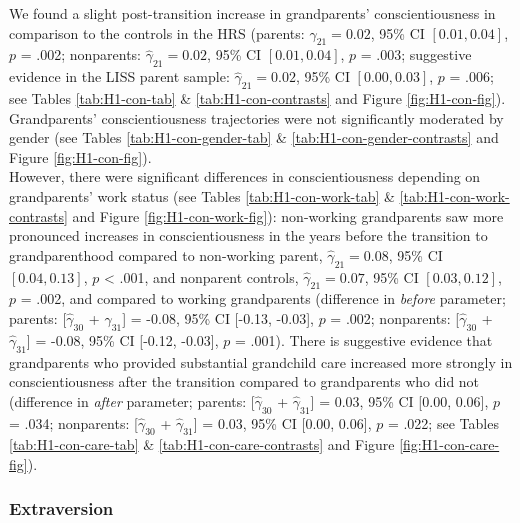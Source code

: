 \documentclass[
  english,
  man, noextraspace]{apa7}
\begin{document}
We found a slight post-transition increase in grandparents' conscientiousness in comparison to the controls in the HRS (parents: \(\hat{\gamma}_{21} = 0.02\), 95\% CI \([0.01, 0.04]\), \(p\) = .002; nonparents: \(\hat{\gamma}_{21} = 0.02\), 95\% CI \([0.01, 0.04]\), \(p\) = .003; suggestive evidence in the LISS parent sample: \(\hat{\gamma}_{21} = 0.02\), 95\% CI \([0.00, 0.03]\), \(p\) = .006; see Tables \ref{tab:H1-con-tab} \& \ref{tab:H1-con-contrasts} and Figure \ref{fig:H1-con-fig}). Grandparents' conscientiousness trajectories were not significantly moderated by gender (see Tables \ref{tab:H1-con-gender-tab} \& \ref{tab:H1-con-gender-contrasts} and Figure \ref{fig:H1-con-fig}).\\
However, there were significant differences in conscientiousness depending on grandparents' work status (see Tables \ref{tab:H1-con-work-tab} \& \ref{tab:H1-con-work-contrasts} and Figure \ref{fig:H1-con-work-fig}): non-working grandparents saw more pronounced increases in conscientiousness in the years before the transition to grandparenthood compared to non-working parent, \(\hat{\gamma}_{21} = 0.08\), 95\% CI \([0.04, 0.13]\), \(p\) \textless{} .001, and nonparent controls, \(\hat{\gamma}_{21} = 0.07\), 95\% CI \([0.03, 0.12]\), \(p\) = .002, and compared to working grandparents (difference in \emph{before} parameter; parents: {[}\(\hat{\gamma}_{30}\) + \(\hat{\gamma}_{31}\){]} = -0.08, 95\% CI {[}-0.13, -0.03{]}, \(p\) = .002; nonparents: {[}\(\hat{\gamma}_{30}\) + \(\hat{\gamma}_{31}\){]} = -0.08, 95\% CI {[}-0.12, -0.03{]}, \(p\) = .001). There is suggestive evidence that grandparents who provided substantial grandchild care increased more strongly in conscientiousness after the transition compared to grandparents who did not (difference in \emph{after} parameter; parents: {[}\(\hat{\gamma}_{30}\) + \(\hat{\gamma}_{31}\){]} = 0.03, 95\% CI {[}0.00, 0.06{]}, \(p\) = .034; nonparents: {[}\(\hat{\gamma}_{30}\) + \(\hat{\gamma}_{31}\){]} = 0.03, 95\% CI {[}0.00, 0.06{]}, \(p\) = .022; see Tables \ref{tab:H1-con-care-tab} \& \ref{tab:H1-con-care-contrasts} and Figure \ref{fig:H1-con-care-fig}).

\hypertarget{extraversion}{%
\subsubsection{Extraversion}\label{extraversion}}
\end{document}
